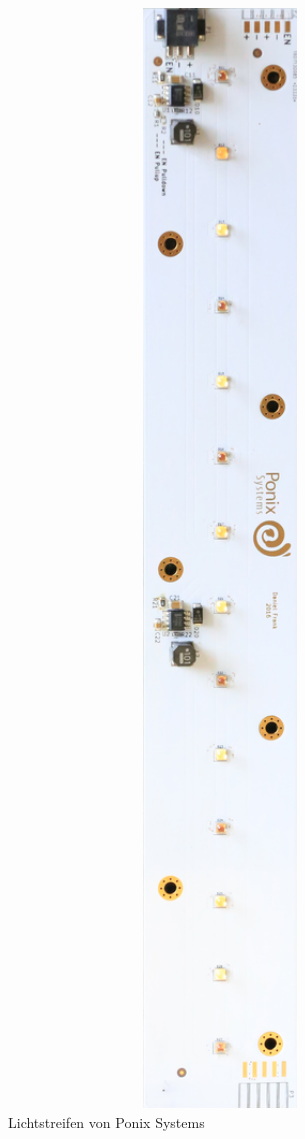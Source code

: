 \begin{figure}[ht]
    \centering
    \includegraphics[angle=90, width=15cm]{images/pflanzenLicht}
    \caption{Lichtstreifen von Ponix Systems}
\end{figure} \\ \mbox{} \\
